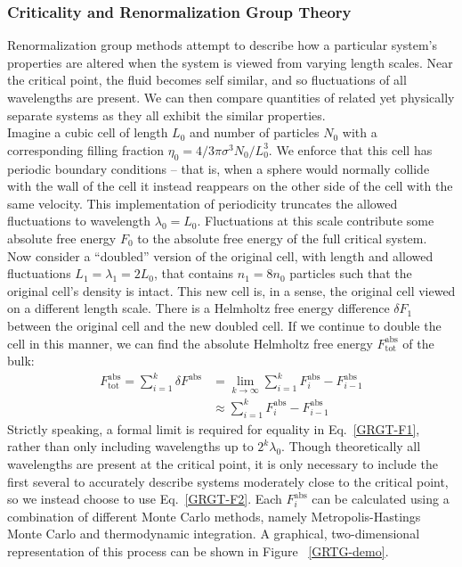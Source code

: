 \documentclass[12pt]{article}
\begin{document}
\subsubsection{Criticality and Renormalization Group Theory}
Renormalization group methods attempt to describe how a particular system's properties are altered when the system is viewed from varying length scales. Near the critical point, the fluid becomes self similar, and so fluctuations of all wavelengths are present. We can then compare quantities of related yet physically separate systems as they all exhibit the similar properties.\\

Imagine a cubic cell of length $L_0$ and number of particles $N_0$ with a corresponding filling fraction $\eta_0 = 4/3\pi\sigma^3N_0/L_0^3$. We enforce that this cell has periodic boundary conditions -- that is, when a sphere would normally collide with the wall of the cell it instead reappears on the other side of the cell with the same velocity. This implementation of periodicity truncates the allowed fluctuations to wavelength $\lambda_0 = L_0$. Fluctuations at this scale contribute some absolute free energy $F_0$ to the absolute free energy of the full critical system. \\

Now consider a ``doubled'' version of the original cell, with length and allowed fluctuations $L_1 = \lambda_1 = 2L_0$, that contains $n_1 = 8n_0$ particles such that the original cell's density is intact. This new cell is, in a sense, the original cell viewed on a different length scale. There is a Helmholtz free energy difference $\delta F_1$ between the original cell and the new doubled cell. If we continue to double the cell in this manner, we can find the absolute Helmholtz free energy $F^{\text{abs}}_{\text{tot}}$ of the bulk:   
\begin{align}
    \label{GRGT-F1}
    F^{\text{abs}}_{\text{tot}} = \sum_{i=1}^{k}\delta F^{\text{abs}} &= \lim_{k\to\infty}\sum_{i=1}^{k} F^{\text{abs}}_{i} - F^{\text{abs}}_{i-1}\\
    &\approx \sum_{i=1}^{k} F^{\text{abs}}_{i} - F^{\text{abs}}_{i-1}
    \label{GRGT-F2}
\end{align}
Strictly speaking, a formal limit is required for equality in Eq.~\ref{GRGT-F1}, rather than only including wavelengths up to $2^k\lambda_0$. Though theoretically all wavelengths are present at the critical point, it is only necessary to include the first several to accurately describe systems moderately close to the critical point, so we instead choose to use Eq.~\ref{GRGT-F2}. Each $F^{\text{abs}}_i$ can be calculated using a combination of different Monte Carlo methods, namely Metropolis-Hastings Monte Carlo and thermodynamic integration. A graphical, two-dimensional representation of this process can be shown in Figure ~\ref{GRTG-demo}.\\
\end{document}
